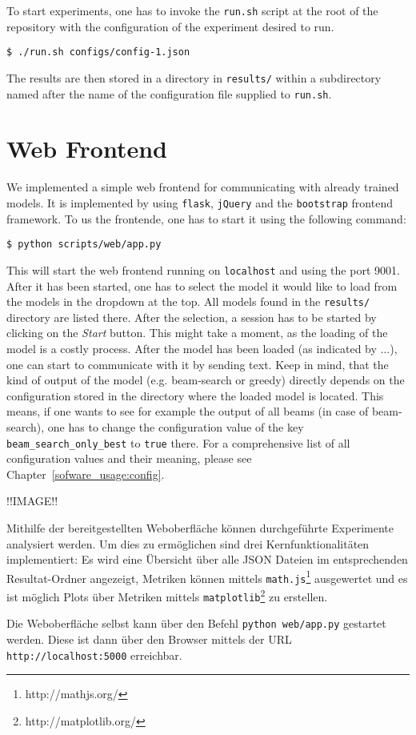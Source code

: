 To start experiments, one has to invoke the \texttt{run.sh} script at the root of the repository with the configuration of the experiment desired to run.

\begin{lstlisting}[frame=none]
$ ./run.sh configs/config-1.json
\end{lstlisting}

The results are then stored in a directory in \texttt{results/} within a subdirectory named after the name of the configuration file supplied to \texttt{run.sh}.

\section{Web Frontend}
We implemented a simple web frontend for communicating with already trained models. It is implemented by using \texttt{flask}, \texttt{jQuery} and the \texttt{bootstrap} frontend framework. To us the frontende, one has to start  it using the following command:

\begin{lstlisting}[frame=none]
$ python scripts/web/app.py
\end{lstlisting}

This will start the web frontend running on \texttt{localhost} and using the port 9001. After it has been started, one has to select the model it would like to load from the models in the dropdown at the top. All models found in the \texttt{results/} directory are listed there. After the selection, a session has to be started by clicking on the \emph{Start} button. This might take a moment, as the loading of the model is a costly process. After the model has been loaded (as indicated by ...), one can start to communicate with it by sending text. Keep in mind, that the kind of output of the model (e.g. beam-search or greedy) directly depends on the configuration stored in the directory where the loaded model is located. This means, if one wants to see for example the output of all beams (in case of beam-search), one has to change the configuration value of the key \texttt{beam\_search\_only\_best} to \texttt{true} there. For a comprehensive list of all configuration values and their meaning, please see Chapter~\ref{sofware_usage:config}.

!!IMAGE!!

Mithilfe der bereitgestellten Weboberfläche können durchgeführte Experimente analysiert werden. Um dies zu ermöglichen sind drei Kernfunktionalitäten implementiert: Es wird eine Übersicht über alle JSON Dateien im entsprechenden Resultat-Ordner angezeigt, Metriken können mittels \texttt{math.js}\footnote{http://mathjs.org/} ausgewertet und es ist möglich Plots über Metriken mittels \texttt{matplotlib}\footnote{http://matplotlib.org/} zu erstellen.

Die Weboberfläche selbst kann über den Befehl \texttt{python web/app.py} gestartet werden. Diese ist dann über den Browser mittels der URL \texttt{http://localhost:5000} erreichbar.